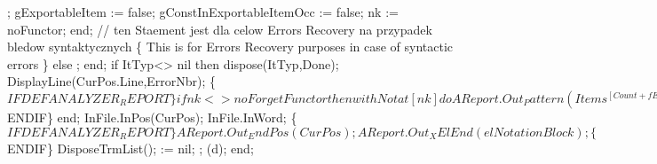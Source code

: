                ;
               gExportableItem := false;
               gConstInExportableItemOcc := false;
               nk := noFunctor;
            end;
         // ten Staement jest dla celow Errors Recovery na przypadek bledow syntaktycznych
         \{ This  is for Errors Recovery purposes in case of syntactic errors \}
      else ;
      end;
      if ItTyp<> nil then dispose(ItTyp,Done);
      DisplayLine(CurPos.Line,ErrorNbr);
      \{$IFDEF ANALYZER_REPORT\}
      if nk <> noForgetFunctor then
         with Notat[nk] do
            AReport.Out_Pattern(Items^[Count + fExtCount - 1],
                                Count + fExtCount);
      \{$ENDIF\}
   end;
   InFile.InPos(CurPos); InFile.InWord;
   \{$IFDEF ANALYZER_REPORT\}
   AReport.Out_EndPos(CurPos);
   AReport.Out_XElEnd(elNotationBlock);
   \{$ENDIF\}
   DisposeTrmList();  := nil;
   ;
   (d);
end;
\eatline
